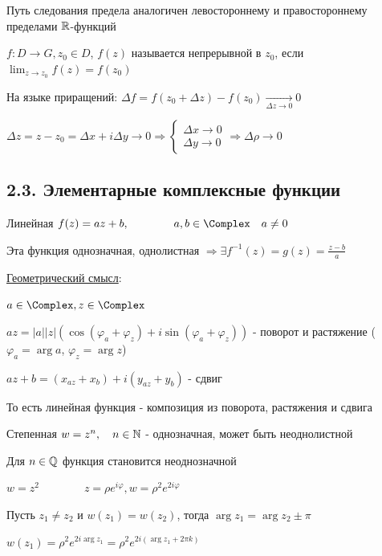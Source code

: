 \documentclass[12pt]{article}
\begin{document}
\Nota Путь следования предела аналогичен левостороннему и правостороннему пределами $\mathbb{R}$-функций

\hypertarget{continuity}{}


$f : D \longrightarrow G, z_0 \in D$, $f(z)$ называется непрерывной в $z_0$, если $\lim_{z \to z_0} f(z) = f(z_0)$

На языке приращений: $\Delta f = f(z_0 + \Delta z) - f(z_0) \underset{\Delta z \to 0}{\longrightarrow} 0$

$\Delta z = z - z_0 = \Delta x + i \Delta y \to 0 \Longrightarrow 
\begin{cases}\Delta x \to 0 \\ \Delta y \to 0\end{cases} \Longrightarrow 
\Delta \rho \to 0$

\subsection{2.3. Элементарные комплексные функции}

\hypertarget{elementary_functions}{}

 Линейная $f(z) = az + b, \qquad\qquad a, b \in \Complex \quad a \neq 0$

Эта функция однозначная, однолистная $\Longrightarrow \exists f^{-1}(z) = g(z) = \frac{z - b}{a}$

\underline{Геометрический смысл}:

$a \in \Complex, z \in \Complex$

$az = |a| |z| (\cos (\varphi_a + \varphi_z) + i \sin (\varphi_a + \varphi_z))$ - поворот и растяжение 
($\varphi_a = \arg a$, $\varphi_z = \arg z$)

$az + b = (x_{az} + x_b) + i (y_{az} + y_b)$ - сдвиг

То есть линейная функция - композиция из поворота, растяжения и сдвига

 Степенная $w = z^n, \quad n \in \mathbb{N}$ - однозначная, может быть неоднолистной

Для $n \in \mathbb{Q}$ функция становится неоднозначной

\Exs $w = z^2 \qquad\qquad z = \rho e^{i\varphi}, w = \rho^2 e^{2i\varphi}$

Пусть $z_1 \neq z_2$ и $w(z_1) = w(z_2)$, тогда $\arg z_1 = \arg z_2 \pm \pi$ 

$w(z_1) = \rho^2 e^{2i\arg z_1} = \rho^2 e^{2i (\arg z_1 + 2\pi k)}$
\end{document}
